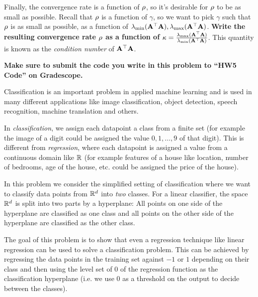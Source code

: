 \documentclass[11pt]{article}
\begin{document}
\begin{Parts}
 

\Part Finally, the convergence rate is a function of $\rho$, so it's desirable
for $\rho$ to be as small as possible. Recall that $\rho$ is a function of $\gamma$,
so we want to pick $\gamma$ such that $\rho$ is as small as possible, as a function of
$\lambda_{\min}(\mathbf{A}^\top\mathbf{A}), \lambda_{\max}(\mathbf{A}^\top\mathbf{A})$.
\textbf{Write the resulting convergence rate $\rho$ as a function of
$\kappa = \frac{\lambda_{\max}(\mathbf{A}^\top\mathbf{A})}{\lambda_{\min}(\mathbf{A}^\top\mathbf{A})}$}. This quantity is known as the \emph{condition number} of $\mathbf{A}^\top\mathbf{A}$.




\end{Parts}


\textbf{Make sure to submit the code you write in this problem to ``HW5 Code'' on Gradescope.}

Classification is an important problem in applied machine
learning and is used in many different applications like image classification,
object detection, speech recognition, machine translation and others.

In \emph{classification}, we assign each datapoint a class from a finite set
(for example the image of a digit could be assigned the value $0, 1, \dots, 9$ of that digit).
This is different from \emph{regression}, where each datapoint is assigned a value from a
continuous domain like $\mathbb{R}$ (for example features of a house like location,
number of bedrooms, age of the house, etc. could be assigned the price of the house).

In this problem we consider the simplified setting of classification where we want to
classify data points from $\mathbb{R}^d$ into \emph{two} classes. For a linear classifier,
the space $\mathbb{R}^d$ is split into two parts by a hyperplane: All points on
one side of the hyperplane are classified as one class and all points on
the other side of the hyperplane are classified as the other class.

The goal of this problem is to
show that even a regression technique like linear regression can be used to solve a
classification problem. This can be
achieved by regressing the data points in the training set against $-1$ or $1$
depending on their class and then using the level set of 0 of the regression
function as the classification hyperplane (i.e. we use 0 as a threshold
on the output to decide between the classes).
\end{document}
